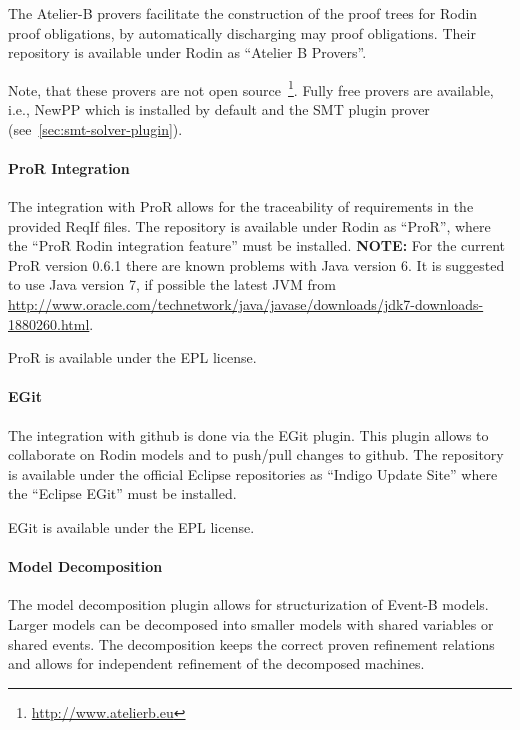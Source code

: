 \documentclass{template/openetcs_article}
\begin{document}
The Atelier-B provers facilitate the construction of the proof trees for Rodin
proof obligations, by automatically discharging may proof obligations. Their
repository is available under Rodin as ``Atelier B Provers''.

Note, that these provers are not open source~\footnote{\url{
    http://www.atelierb.eu}}. Fully free provers are available, i.e., NewPP
which is installed by default and the SMT plugin prover
(see~\ref{sec:smt-solver-plugin}).

\paragraph{ProR Integration}
\label{sec:pror-integration}

The integration with ProR allows for the traceability of requirements in the
provided ReqIf files. The repository is available under Rodin as ``ProR'', where
the ``ProR Rodin integration feature'' must be installed. {\bf NOTE: } For the
current ProR version 0.6.1 there are known problems with Java version 6. It is
suggested to use Java version 7, if possible the latest JVM from
\url{http://www.oracle.com/technetwork/java/javase/downloads/jdk7-downloads-1880260.html}.

ProR is available under the EPL license.

\paragraph{EGit}
\label{sec:egit}

The integration with github is done via the EGit plugin. This plugin allows to
collaborate on Rodin models and to push/pull changes to github. The repository
is available under the official Eclipse repositories as ``Indigo Update Site''
where the ``Eclipse EGit'' must be installed.

EGit is available under the EPL license.

\paragraph{Model Decomposition}
\label{sec:model-decomposition}

The model decomposition plugin allows for structurization of Event-B
models. Larger models can be decomposed into smaller models with shared
variables or shared events. The decomposition keeps the correct proven
refinement relations and allows for independent refinement of the decomposed
machines. 
\end{document}

